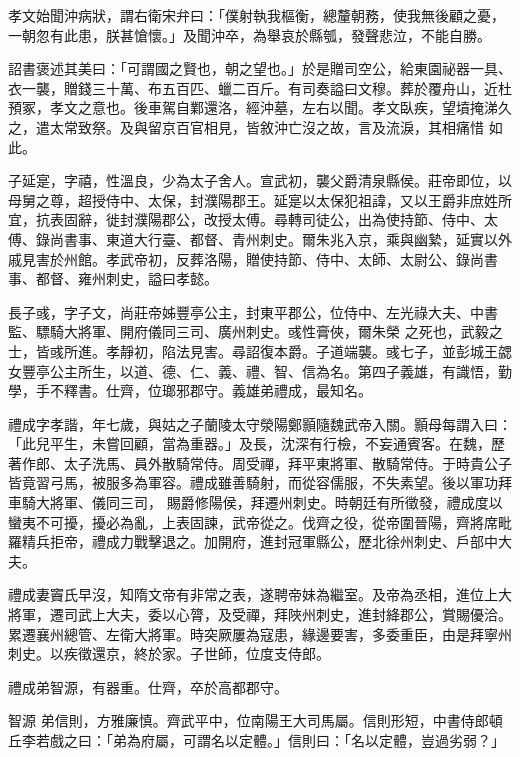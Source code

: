 \begin{pinyinscope}
 孝文始聞沖病狀，謂右衛宋弁曰：「僕射執我樞衡，總釐朝務，使我無後顧之憂，一朝忽有此患，朕甚愴懷。」及聞沖卒，為舉哀於縣瓠，發聲悲泣，不能自勝。



 詔書褒述其美曰：「可謂國之賢也，朝之望也。」於是贈司空公，給東園祕器一具、衣一襲，贈錢三十萬、布五百匹、蠟二百斤。有司奏謚曰文穆。葬於覆舟山，近杜預冢，孝文之意也。後車駕自鄴還洛，經沖墓，左右以聞。孝文臥疾，望墳掩涕久之，遣太常致祭。及與留京百官相見，皆敘沖亡沒之故，言及流淚，其相痛惜
 如此。



 子延寔，字禧，性溫良，少為太子舍人。宣武初，襲父爵清泉縣侯。莊帝即位，以母舅之尊，超授侍中、太保，封濮陽郡王。延寔以太保犯祖諱，又以王爵非庶姓所宜，抗表固辭，徙封濮陽郡公，改授太傅。尋轉司徒公，出為使持節、侍中、太傅、錄尚書事、東道大行臺、都督、青州刺史。爾朱兆入京，乘與幽縶，延實以外戚見害於州館。孝武帝初，反葬洛陽，贈使持節、侍中、太師、太尉公、錄尚書事、都督、雍州刺史，謚曰孝懿。



 長子彧，字子文，尚莊帝姊豐亭公主，封東平郡公，位侍中、左光祿大夫、中書監、驃騎大將軍、開府儀同三司、廣州刺史。彧性膏俠，爾朱榮
 之死也，武毅之士，皆彧所進。孝靜初，陷法見害。尋詔復本爵。子道端襲。彧七子，並彭城王勰女豐亭公主所生，以道、德、仁、義、禮、智、信為名。第四子義雄，有識悟，勤學，手不釋書。仕齊，位瑯邪郡守。義雄弟禮成，最知名。



 禮成字孝諧，年七歲，與姑之子蘭陵太守滎陽鄭顥隨魏武帝入關。顥母每謂入曰：「此兒平生，未嘗回顧，當為重器。」及長，沈深有行檢，不妄通賓客。在魏，歷著作郎、太子洗馬、員外散騎常侍。周受禪，拜平東將軍、散騎常侍。于時貴公子皆竟習弓馬，被服多為軍容。禮成雖善騎射，而從容儒服，不失素望。後以軍功拜車騎大將軍、儀同三司，
 賜爵修陽侯，拜遷州刺史。時朝廷有所徵發，禮成度以蠻夷不可擾，擾必為亂，上表固諫，武帝從之。伐齊之役，從帝圍晉陽，齊將席毗羅精兵拒帝，禮成力戰擊退之。加開府，進封冠軍縣公，歷北徐州刺史、戶部中大夫。



 禮成妻竇氏早沒，知隋文帝有非常之表，遂聘帝妹為繼室。及帝為丞相，進位上大將軍，遷司武上大夫，委以心膂，及受禪，拜陜州刺史，進封絳郡公，賞賜優洽。累遷襄州總管、左衛大將軍。時突厥屢為寇患，緣邊要害，多委重臣，由是拜寧州刺史。以疾徵還京，終於家。子世師，位度支侍郎。



 禮成弟智源，有器重。仕齊，卒於高都郡守。



 智源
 弟信則，方雅廉慎。齊武平中，位南陽王大司馬屬。信則形短，中書侍郎頓丘李若戲之曰：「弟為府屬，可謂名以定體。」信則曰：「名以定體，豈過劣弱？」




\end{pinyinscope}
